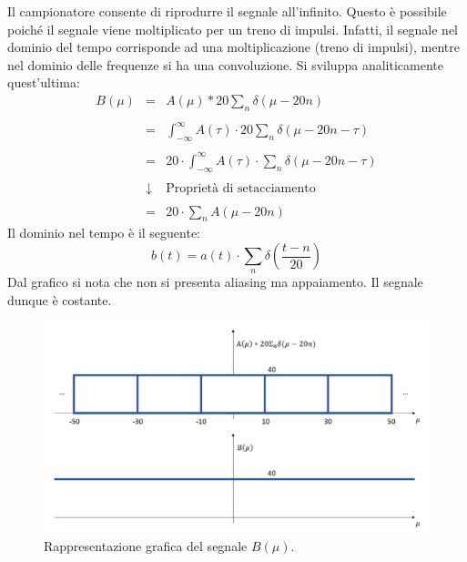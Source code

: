 \documentclass[a4paper]{article}
\begin{document}
	Il campionatore consente di riprodurre il segnale all'infinito. Questo è possibile poiché il segnale viene moltiplicato per un treno di impulsi. Infatti, il segnale nel dominio del tempo corrisponde ad una moltiplicazione (treno di impulsi), mentre nel dominio delle frequenze si ha una convoluzione. Si sviluppa analiticamente quest'ultima:
	\begin{equation*}
		\begin{array}{lll}
			B\left(\mu\right) & = & A\left(\mu\right) * 20\displaystyle\sum_{n} \delta\left(\mu - 20n\right) \\
			\\
			& = & \displaystyle\int_{-\infty}^{\infty} A\left(\tau\right) \cdot 20\displaystyle\sum_{n} \delta\left(\mu - 20n - \tau\right) \\
			\\
			& = & 20 \cdot \displaystyle\int_{-\infty}^{\infty} A\left(\tau\right) \cdot \displaystyle\sum_{n} \delta\left(\mu - 20n - \tau\right) \\
			\\
			& \downarrow & \text{Proprietà di setacciamento} \\
			\\
			& = & 20 \cdot \displaystyle\sum_{n} A\left(\mu - 20n\right)
		\end{array}
	\end{equation*}
	Il dominio nel tempo è il seguente:
	\begin{equation*}
		b\left(t\right) = a\left(t\right) \cdot \displaystyle\sum_{n} \delta\left(\dfrac{t - n}{20}\right)
	\end{equation*}
	Dal grafico si nota che non si presenta aliasing ma appaiamento. Il segnale dunque è costante.
	\begin{figure}[!htp]
		\centering
		\includegraphics[width=\textwidth]{img/fig_3.png}
		\caption*{Rappresentazione grafica del segnale $B\left(\mu\right)$.}
	\end{figure}\newpage
\end{document}

